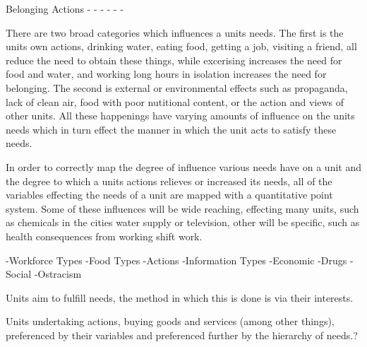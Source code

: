 Belonging Actions
-
-
-
-
-
-


There are two broad categories which influences a units needs. The first is the units own actions, drinking water, eating food, getting a job, visiting a friend, all reduce the need to obtain these things, while excerising increases the need for food and water, and working long hours in isolation increases the need for belonging. The second is external or environmental effects such as propaganda, lack of clean air, food with poor nutitional content, or the action and views of other units. All these happenings have varying amounts of influence on the units needs which in turn effect the manner in which the unit acts to satisfy these needs.

In order to correctly map the degree of influence various needs have on a unit and the degree to which a units actions relieves or increased its needs, all of the variables effecting the needs of a unit are mapped with a quantitative point system. Some of these influences will be wide reaching, effecting many units, such as chemicals in the cities water supply or television, other will be specific, such as health consequences from working shift work. 


-Workforce Types
-Food Types
-Actions
-Information Types
-Economic 
-Drugs
-Social
-Ostracism



%
%
%
%
%
%
%





Units aim to fulfill needs, the method in which this is done is via their interests.

Units undertaking actions, buying goods and services (among other things), preferenced by their variables and preferenced further by the hierarchy of needs.?






